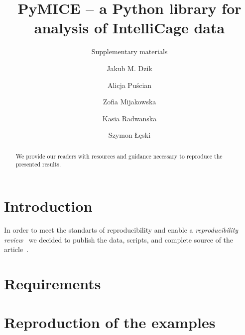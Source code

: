 \documentclass[smallextended]{svjour3}       %
\begin{document}
\title{PyMICE -- a Python library for analysis of IntelliCage data
}
\subtitle{Supplementary materials}


\author{Jakub M. Dzik \and
        Alicja Puścian \and
        Zofia Mijakowska \and
        Kasia Radwanska \and
        Szymon Łęski
}


\maketitle

\begin{abstract}
We provide our readers with resources and guidance necessary to reproduce
the presented results.

\end{abstract}

\tableofcontents
\newpage

\section{Introduction}
In order to meet the standarts of reproducibility and enable a \emph{reproducibility
review}~\cite{peng2011} we decided to publish the data, scripts, and complete
source of the article~\cite{buckheit1995,literateProgramming}.


\section{Requirements}



\section{Reproduction of the examples}
\label{examples}
\end{document}
